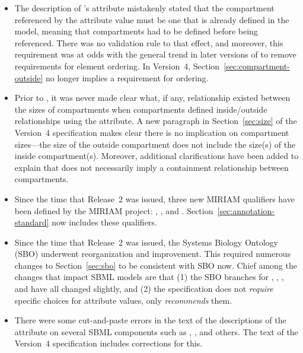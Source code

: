 \begin{itemize}
\item The description of \Compartment's  attribute
  mistakenly stated that the compartment referenced by the
  attribute value must be one that is already defined in the
  model, meaning that compartments had to be defined before being
  referenced.  There was no validation rule to that effect, and
  moreover, this requirement was at odds with the general trend in
  later versions of \sbmltwo to remove requirements for
  element ordering.  In Version~4,
  Section~\ref{sec:compartment-outside} no longer implies a
  requirement for ordering.

\item Prior to \sbmltwofour, it was never made clear what, if any,
  relationship existed between the sizes of compartments when
  compartments defined inside/outside relationships using the
   attribute.  A new paragraph in
  Section~\ref{sec:size} of the Version~4 specification makes
  clear there is no implication on compartment sizes---the size of
  the outside compartment does not include the size(s) of the
  inside compartment(s).  Moreover, additional clarifications have
  been added to explain that  does not necessarily
  imply a containment relationship between compartments.

\item Since the time that \sbmltwothree Release~2 was issued,
  three new MIRIAM qualifiers have been defined by the MIRIAM
  project: , , and
  .  Section~\ref{sec:annotation-standard}
  now includes these qualifiers.

\item Since the time that \sbmltwothree Release~2 was issued, the
  Systems Biology Ontology (SBO) underwent reorganization and
  improvement.  This required numerous changes to
  Section~\ref{sec:sbo} to be consistent with SBO now.  Chief
  among the changes that impact SBML models are that (1) the SBO
  branches for \Model, \CompartmentType, \SpeciesType,
  \Compartment and \Species have all changed slightly, and (2) the
  \sbmltwofour specification does not \emph{require} specific
  choices for  attribute values, only
  \emph{recommends} them.

\item There were some cut-and-paste errors in the text of the
  descriptions of the  attribute on several SBML
  components such as \Species, \SpeciesType, and others.  The text
  of the Version~4 specification includes corrections for this.


\end{itemize}
